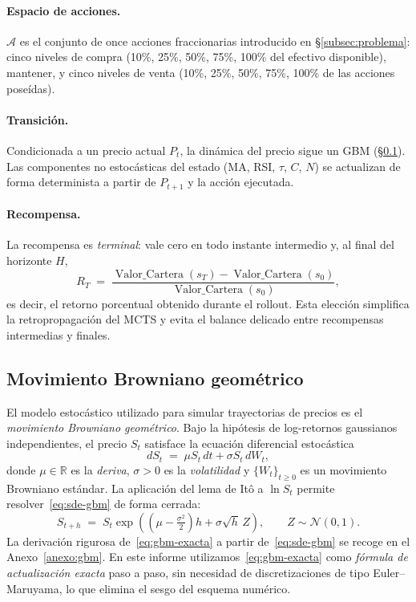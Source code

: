 \paragraph{Espacio de acciones.} $\mathcal{A}$ es el conjunto de once acciones fraccionarias introducido en §\ref{subsec:problema}: cinco niveles de compra (10\%, 25\%, 50\%, 75\%, 100\% del efectivo disponible), mantener, y cinco niveles de venta (10\%, 25\%, 50\%, 75\%, 100\% de las acciones poseídas).

\paragraph{Transición.} Condicionada a un precio actual $P_t$, la dinámica del precio sigue un GBM (§\ref{subsec:gbm}). Las componentes no estocásticas del estado (MA, RSI, $\tau$, $C$, $N$) se actualizan de forma determinista a partir de $P_{t+1}$ y la acción ejecutada.

\paragraph{Recompensa.} La recompensa es \emph{terminal}: vale cero en todo instante intermedio y, al final del horizonte $H$,
\[
    R_T \;=\; \frac{\operatorname{Valor\_Cartera}(s_T) - \operatorname{Valor\_Cartera}(s_0)}{\operatorname{Valor\_Cartera}(s_0)},
\]
es decir, el retorno porcentual obtenido durante el rollout. Esta elección simplifica la retropropagación del MCTS y evita el balance delicado entre recompensas intermedias y finales.

\subsection{Movimiento Browniano geométrico}
\label{subsec:gbm}

El modelo estocástico utilizado para simular trayectorias de precios es el \emph{movimiento Browniano geométrico}. Bajo la hipótesis de log-retornos gaussianos independientes, el precio $S_t$ satisface la ecuación diferencial estocástica
\begin{equation}
    dS_t \;=\; \mu S_t \, dt + \sigma S_t \, dW_t,
    \label{eq:sde-gbm}
\end{equation}
donde $\mu \in \mathbb{R}$ es la \emph{deriva}, $\sigma > 0$ es la \emph{volatilidad} y $\{W_t\}_{t\geq 0}$ es un movimiento Browniano estándar. La aplicación del lema de Itô a $\ln S_t$ permite resolver~\eqref{eq:sde-gbm} de forma cerrada:
\begin{equation}
    S_{t+h} \;=\; S_t \exp\!\left( \left(\mu - \tfrac{\sigma^2}{2}\right) h + \sigma \sqrt{h}\, Z \right), \qquad Z \sim \mathcal{N}(0,1).
    \label{eq:gbm-exacta}
\end{equation}
La derivación rigurosa de~\eqref{eq:gbm-exacta} a partir de~\eqref{eq:sde-gbm} se recoge en el Anexo~\ref{anexo:gbm}. En este informe utilizamos~\eqref{eq:gbm-exacta} como \emph{fórmula de actualización exacta} paso a paso, sin necesidad de discretizaciones de tipo Euler--Maruyama, lo que elimina el sesgo del esquema numérico.


